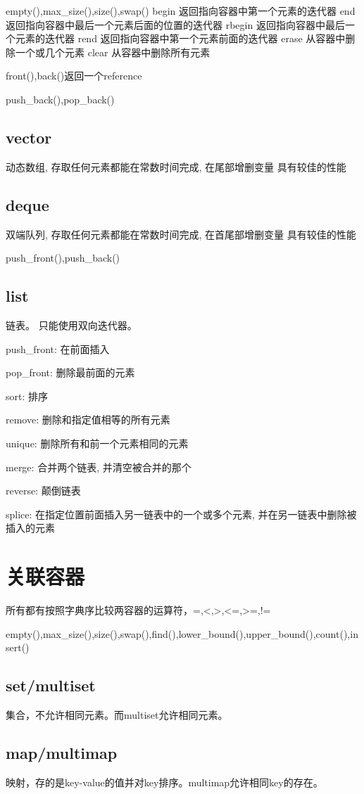 \documentclass[UTF8]{ctexart}
\begin{document}
empty(),max_size(),size(),swap()
begin 返回指向容器中第一个元素的迭代器
end 返回指向容器中最后一个元素后面的位置的迭代器
rbegin 返回指向容器中最后一个元素的迭代器
rend 返回指向容器中第一个元素前面的迭代器
erase 从容器中删除一个或几个元素
clear 从容器中删除所有元素

front(),back()返回一个reference

push_back(),pop_back()
\subsection{vector}
动态数组, 存取任何元素都能在常数时间完成, 在尾部增删变量
具有较佳的性能
\subsection{deque}
双端队列, 存取任何元素都能在常数时间完成, 在首尾部增删变量
具有较佳的性能

push_front(),push_back()
\subsection{list}
链表。
只能使用双向迭代器。

push_front: 在前面插入

pop_front: 删除最前面的元素

sort: 排序

remove: 删除和指定值相等的所有元素

unique: 删除所有和前一个元素相同的元素

merge: 合并两个链表, 并清空被合并的那个

reverse: 颠倒链表

splice: 在指定位置前面插入另一链表中的一个或多个元素, 并在另一链表中删除被插入的元素

\section{关联容器}
所有都有按照字典序比较两容器的运算符，=,<,>,<=,>=,!=

empty(),max_size(),size(),swap(),find(),lower_bound(),upper_bound(),count(),insert()
\subsection{set/multiset}
集合，不允许相同元素。而multiset允许相同元素。

\subsection{map/multimap}
映射，存的是key-value的值并对key排序。multimap允许相同key的存在。
\end{document}
